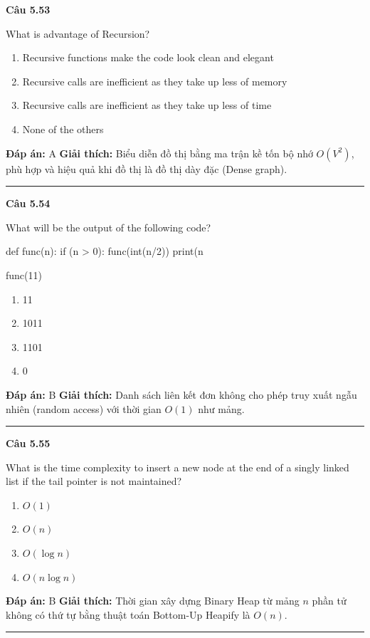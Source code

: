\documentclass[11pt,a4paper]{article}
\newenvironment{question}[1]{%
  \par\vspace{1em}\noindent\textbf{\large Câu #1}\par\vspace{0.4em}
}{%
  \par\vspace{1em}\hrule\vspace{0.6em}
}
\newenvironment{choices}{%
  \begin{enumerate}[label=\textbf{\Alph*.},leftmargin=2.2em,itemsep=2pt,topsep=3pt]
}{%
  \end{enumerate}
}
\newcommand{\choice}{\item}
\newenvironment{codebox}{%
  \begin{tcolorbox}[colback=gray!8!white,colframe=gray!50!black,arc=1.5mm,boxrule=0.6pt,left=3mm,right=3mm,top=2.5mm,bottom=2.5mm]
  \ttfamily\small
}{%
  \end{tcolorbox}
}
\begin{document}
\begin{question}{5.53}
What is advantage of Recursion?
\begin{choices}
\choice Recursive functions make the code look clean and elegant
\choice Recursive calls are inefficient as they take up less of memory
\choice Recursive calls are inefficient as they take up less of time
\choice None of the others
\end{choices}
\textbf{Đáp án:} A
\textbf{Giải thích:} Biểu diễn đồ thị bằng ma trận kề tốn bộ nhớ $O(V^2)$, phù hợp và hiệu quả khi đồ thị là đồ thị dày đặc (Dense graph).
\end{question}

\begin{question}{5.54}
What will be the output of the following code?
\begin{codebox}
def func(n):
    if (n > 0):
        func(int(n/2))
        print(n%

func(11)
\end{codebox}
\begin{choices}
\choice 11
\choice 1011
\choice 1101
\choice 0
\end{choices}
\textbf{Đáp án:} B
\textbf{Giải thích:} Danh sách liên kết đơn không cho phép truy xuất ngẫu nhiên (random access) với thời gian $O(1)$ như mảng.
\end{question}

\begin{question}{5.55}
What is the time complexity to insert a new node at the end of a singly linked list if the tail pointer is not maintained?
\begin{choices}
\choice $O(1)$
\choice $O(n)$
\choice $O(\log n)$
\choice $O(n \log n)$
\end{choices}
\textbf{Đáp án:} B
\textbf{Giải thích:} Thời gian xây dựng Binary Heap từ mảng $n$ phần tử không có thứ tự bằng thuật toán Bottom-Up Heapify là $O(n)$.
\end{question}
\end{document}
